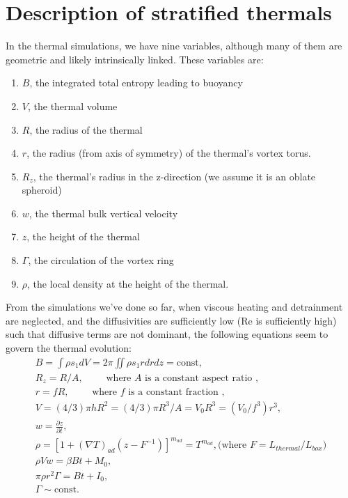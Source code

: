 \documentclass[onecolumn, amsmath, amsfonts, amssymb]{aastex62}
\newcommand{\grad}{\ensuremath{\nabla}}
\begin{document}
\section{Description of stratified thermals}
In the thermal simulations, we have nine variables, although many of them are geometric and
likely intrinsically linked. These variables are:
\begin{enumerate}
\item $B$, the integrated total entropy leading to buoyancy
\item $V$, the thermal volume
\item $R$, the radius of the thermal
\item $r$, the radius (from axis of symmetry) of the thermal's vortex torus.
\item $R_z$, the thermal's radius in the z-direction (we assume it is an oblate spheroid)
\item $w$, the thermal bulk vertical velocity
\item $z$, the height of the thermal
\item $\Gamma$, the circulation of the vortex ring
\item $\rho$, the local density at the height of the thermal.
\end{enumerate}
From the simulations we've done so far, when viscous heating and detrainment are neglected, and the
diffusivities are sufficiently low (Re is sufficiently high) such that diffusive terms are not dominant, the following
equations seem to govern the thermal evolution:
\begin{gather}
B = \int \rho s_1 dV = 2\pi \iint \rho s_1 r dr dz = \text{const}, \\
R_z = R/A,\qquad \text{ where $A$ is a constant aspect ratio },\\
r = f R, \qquad \text{ where $f$ is a constant fraction }, \\
V = (4/3)\pi h R^2 = (4/3)\pi R^3/A = V_0 R^3 = (V_0/f^3) r^3, \\
w = \frac{\partial z}{\partial t},\\
\rho = [1 + (\grad T)_{ad}(z - F^{-1})]^{m_{ad}} = T^{m_{ad}}, \text{(where $F = L_{thermal}/L_{box}$)}\\
\rho V w = \beta B t + M_0,  \label{eqn:momentum} \\
\pi\rho r^2 \Gamma = B t + I_0, \label{eqn:impulse} \\
\Gamma \sim \text{const.}
\end{gather}
\end{document}
